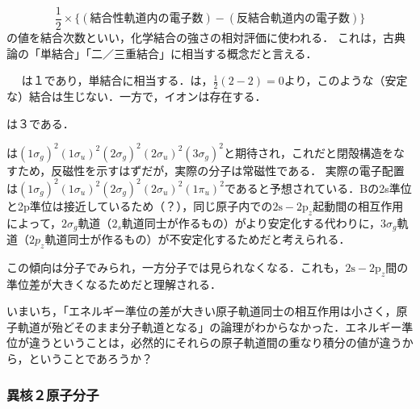 \documentclass[uplatex, dvipdfmx]{jsreport}
\begin{document}
\begin{definition}[結合次数]
    \[ \frac{1}{2}\times\{ (結合性軌道内の電子数)-(反結合軌道内の電子数)\} \]
    の値を結合次数といい，化学結合の強さの相対評価に使われる．
    これは，古典論の「単結合」「二／三重結合」に相当する概念だと言える．
\end{definition}
\begin{example}　
    は１であり，単結合に相当する．は，$\frac{1}{2}(2-2)=0$より，このような（安定な）結合は生じない．一方で，イオンは存在する．

    は３である．
\end{example}
\begin{example}
    は$(1\sigma_g)^2(1\sigma_u)^2(2\sigma_g)^2(2\sigma_u)^2(3\sigma_g)^2$と期待され，これだと閉殻構造をなすため，反磁性を示すはずだが，実際の分子は常磁性である．
    実際の電子配置は$(1\sigma_g)^2(1\sigma_u)^2(2\sigma_g)^2(2\sigma_u)^2(1\pi_u)^2$であると予想されている．Bの2s準位と2p準位は接近しているため（？），同じ原子内での$\mathrm{2s-2p}_z$起動間の相互作用によって，$2\sigma_g$軌道（$2_s$軌道同士が作るもの）がより安定化する代わりに，$3\sigma_g$軌道（$2p_z$軌道同士が作るもの）が不安定化するためだと考えられる．

    この傾向は分子でみられ，一方分子では見られなくなる．これも，$\mathrm{2s-2p}_z$間の準位差が大きくなるためだと理解される．
\end{example}

\begin{screen}
    いまいち，「エネルギー準位の差が大きい原子軌道同士の相互作用は小さく，原子軌道が殆どそのまま分子軌道となる」の論理がわからなかった．エネルギー準位が違うということは，必然的にそれらの原子軌道間の重なり積分の値が違うから，ということであろうか？
\end{screen}

\subsubsection{異核２原子分子}
\end{document}
